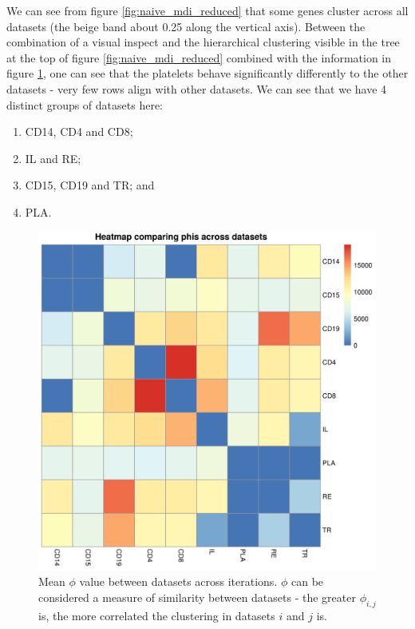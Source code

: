 \documentclass[12pt]{article} %
\begin{document}
	We can see from figure \ref{fig:naive_mdi_reduced} that some genes cluster across all datasets (the beige band about 0.25 along the vertical axis). Between the combination of a visual inspect and the hierarchical clustering visible in the tree at the top of figure \ref{fig:naive_mdi_reduced} combined with the information in figure \ref{fig:naive_mdi_reduced_phi_heatmap}, one can see that the platelets behave significantly differently to the other datasets - very few rows align with other datasets. We can see that we have 4 distinct groups of datasets here:
	\begin{enumerate} \label{list:datasets_naive_mdi_reduced}
		\item CD14, CD4 and CD8;
		\item IL and RE;
		\item CD15, CD19 and TR; and
		\item PLA.
	\end{enumerate}

	\begin{figure}[h]
		\centering
		\includegraphics[scale=0.75]{Images/Initial_analysis/Phi_heatmap_1.png}
		\caption{Mean $\phi$ value between datasets across iterations. $\phi$ can be considered a measure of similarity between datasets - the greater $\phi_{i,j}$ is, the more correlated the clustering in datasets $i$ and $j$ is.}
		\label{fig:naive_mdi_reduced_phi_heatmap}
	\end{figure}
	
\end{document}
